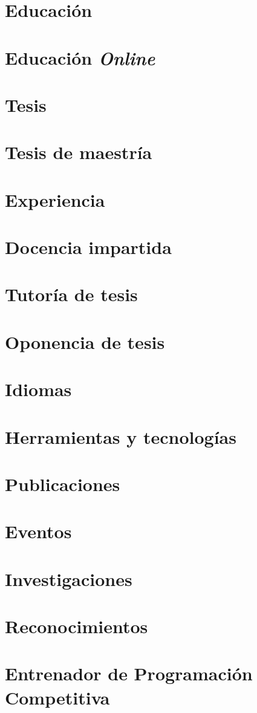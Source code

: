 \makecvtitle

\section{Educación}

\section{Educación \emph{Online}}

\section{Tesis}

\section{Tesis de maestría}

\section{Experiencia}

\section{Docencia impartida}

\section{Tutoría de tesis}

\section{Oponencia de tesis}

\section{Idiomas}

\section{Herramientas y tecnologías}

\section{Publicaciones}

\section{Eventos}

\section{Investigaciones}

\section{Reconocimientos}

\section{Entrenador de Programación Competitiva}

